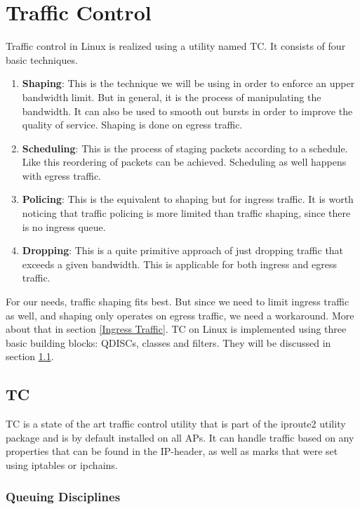 \chapter{Traffic Control}
Traffic control in Linux is realized using a utility named \acs{TC}. It consists of four basic techniques.

\begin{enumerate}
\item \textbf{Shaping}: This is the technique we will be using in order to enforce an upper bandwidth limit. But in general, it is the process of manipulating the bandwidth. It can also be used to smooth out bursts in order to improve the quality of service. Shaping is done on egress traffic.

\item \textbf{Scheduling}: This is the process of staging packets according to a schedule. Like this reordering of packets can be achieved. Scheduling as well happens with egress traffic.

\item \textbf{Policing}: This is the equivalent to shaping but for ingress traffic. It is worth noticing that traffic policing is more limited than traffic shaping, since there is no ingress queue.

\item \textbf{Dropping}: This is a quite primitive approach of just dropping traffic that exceeds a given bandwidth. This is applicable for both ingress and egress traffic.
\end{enumerate}

For our needs, traffic shaping fits best. But since we need to limit ingress traffic as well, and shaping only operates on egress traffic, we need a workaround. More about that in section  \ref{Ingress Traffic}. \acl{TC} on Linux is implemented using three basic building blocks: \acp{QDISC}, classes and filters. They will be discussed in section \ref{TC}.

\newpage
\section{TC} \label{TC}
\acs{TC} is a state of the art traffic control utility that is part of the iproute2 utility package and is by default installed on all \aclp{AP}. It can handle traffic based on any properties that can be found in the \acs{IP}-header, as well as marks that were set using iptables or ipchains.

\subsection{Queuing Disciplines}

